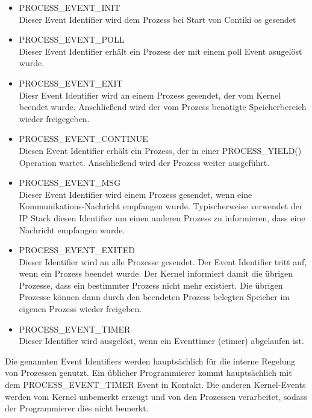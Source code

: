 	\begin{itemize}
		\item PROCESS\_EVENT\_INIT\\
		Dieser Event Identifier wird dem Prozess bei Start von Contiki \ac{os} gesendet
		\item PROCESS\_EVENT\_POLL\\
		Dieser Event Identifier erhält ein Prozess der mit einem poll Event asugelöst wurde.
		\item PROCESS\_EVENT\_EXIT\\
		Diesr Event Identifier wird an einem Prozess gesendet, der vom Kernel beendet wurde. Anschließend wird der vom Prozess benötigte Speicherbereich wieder freigegeben.
		\item PROCESS\_EVENT\_CONTINUE\\
		Diesen Event Identifier erhält ein Prozess, der in einer PROCESS\_YIELD() Operation wartet. Anschließend wird der Prozess weiter ausgeführt.
		\item PROCESS\_EVENT\_MSG\\
		Dieser Event Identifier wird einem Prozess gesendet, wenn eine Kommunikations-Nachricht empfangen wurde. Typischerweise verwendet der IP Stack diesen Identifier um einen anderen Prozess zu informieren, dass eine Nachricht empfangen wurde.
		\item PROCESS\_EVENT\_EXITED\\
		Dieser Identifier wird an alle Prozesse gesendet. Der Event Identifier tritt auf, wenn ein Prozess beendet wurde. Der Kernel informiert damit die übrigen Prozesse, dass ein bestimmter Prozess nicht mehr existiert. Die übrigen Prozesse können dann durch den beendeten Prozess belegten Speicher im eigenen Prozess wieder freigeben.
		\item PROCESS\_EVENT\_TIMER\\
		Dieser Identifier wird ausgelöst, wenn ein Eventtimer (etimer) abgelaufen ist.
	\end{itemize}	
	Die genannten Event Identifiers werden hauptsächlich für die interne Regelung von Prozessen genutzt. Ein üblicher Programmierer kommt hauptsächlich mit dem PROCESS\_EVENT\_TIMER Event in Kontakt. Die anderen Kernel-Events werden vom Kernel unbemerkt erzeugt und  von den Prozessen verarbeitet, sodass der Programmierer dies nicht bemerkt.
	
